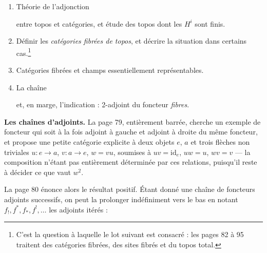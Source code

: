 \documentclass[11pt,a4paper]{article}
\begin{document}
\begin{enumerate}
\item[8)] Théorie de l'adjonction


entre topos et catégories, et étude des topos dont les $H^{i}$ sont finis.

\item[9)] Définir les \emph{catégories fibrées de topos}, et décrire la
situation dans certains cas.\footnote{C'est la question à laquelle le lot
suivant est consacré : les pages 82 à 95 traitent des catégories fibrées, des
sites fibrés et du topos total.}

\item[10)] Catégories fibrées et champs essentiellement représentables.

\item[11)] La chaîne


et, en marge, l'indication : 2-adjoint du foncteur \emph{fibres}.
\end{enumerate}


\textbf{Les chaînes d'adjoints.} La page 79, entièrement barrée, cherche un
exemple de foncteur qui soit à la fois adjoint à gauche et adjoint à droite du
même foncteur, et propose une petite catégorie explicite à deux objets $e$, $a$
et trois flèches non triviales $u : e \to a$, $v : a \to e$, $w = vu$, soumises
à $uv = \mathrm{id}_{e}$, $uw = u$, $wv = v$ — la composition n'étant pas
entièrement déterminée par ces relations, puisqu'il reste à décider ce que vaut
$w^{2}$.

La page 80 énonce alors le résultat positif. Étant donné une chaîne de
foncteurs adjoints successifs, on peut la prolonger indéfiniment vers le bas en
notant $f_{!}, f^{*}, f_{*}, f^{!}, \ldots$ les adjoints itérés :

\end{document}
